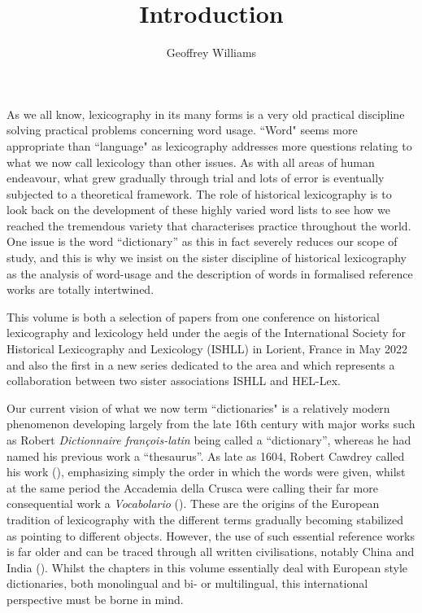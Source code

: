 \documentclass[output=paper]{langscibook}
\author{Geoffrey Williams\affiliation{Université de Bretagne Sud; Université Grenoble Alpes}}
\title{Introduction}
\begin{document}
\maketitle
\noindent
As we all know, lexicography in its many forms is a very old practical discipline solving practical problems concerning word usage. “Word" seems more appropriate than “language" as lexicography addresses more questions relating to what we now call lexicology than other issues. As with all areas of human endeavour, what grew gradually through trial and lots of error is eventually subjected to a theoretical framework. The role of historical lexicography is to look back on the development of these highly varied word lists to see how we reached the tremendous variety that characterises practice throughout the world. One issue is the word “dictionary” as this in fact severely reduces our scope of study, and this is why we insist on the sister discipline of historical lexicography as the analysis of word\hyp usage and the description of words in formalised reference works are totally intertwined.

This volume is both a selection of papers from one conference on historical lexicography and lexicology held under the aegis of the International Society for Historical Lexicography and Lexicology (ISHLL) in Lorient, France in May 2022  and also the first in a new  series dedicated to the area and which represents a collaboration between two sister associations ISHLL and HEL-Lex.

Our current vision of what we now term “dictionaries" is a relatively modern phenomenon developing largely from the late 16th century with major works such as Robert  \textit{Dictionnaire françois-latin} being called a “dictionary”, whereas he had named his previous work a “thesaurus”. As late as 1604, Robert Cawdrey called his work  (\citeyear{Cawdrey1604}), emphasizing simply the order in which the words were given, whilst at the same period the Accademia della Crusca were calling their far more consequential work a \emph{Vocabolario} (\citealt{Accademia_della_crusca1612}). These are the origins of the European tradition of lexicography with the different terms gradually becoming stabilized as pointing to different objects. However, the use of such essential reference works is far older and can be traced through all written civilisations, notably China and India (\citealt{YongPeng2008}). Whilst the chapters in this volume essentially deal with European style dictionaries, both monolingual and bi- or multilingual, this international perspective must be borne in mind.
\end{document}
